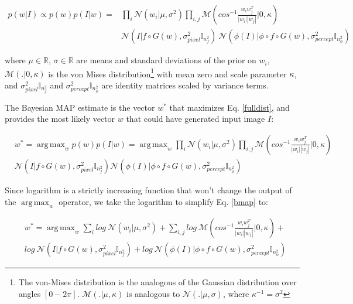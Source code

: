 \documentclass{article}
\DeclareMathOperator*{\argmax}{arg\,max}
\newcommand{\mc}[1]{\mathbb{#1}}
\newcommand{\ci}[1]{\circ{#1}}
\begin{document}
\begin{equation}
\begin{aligned}
\label{fulldist}
p(w|I) \propto p(w)p(I|w) = & \prod_i \mathcal{N}(w_i|\mu, \sigma^2) \prod_{i,j} \mathcal{M}(cos^{-1}\frac{w_iw_j^T}{|w_i| |w_j|}|0, \kappa) \\
             & \mathcal{N}(I|f \ci G(w), \sigma_{pixel}^2 \mc{I}_{n_f^2})\ \mathcal{N}(\phi(I)|\phi \ci f \ci G(w), \sigma_{percept}^2 \mc{I}_{n_{\phi}^2}) 
\end{aligned}
\end{equation}

where $\mu \in \mc{R}$, $\sigma \in \mc{R}$ are means and standard deviations of the prior on $w_i$, $\mathcal{M}(.|0, \kappa)$ is the von Mises distribution\footnote{The von-Mises distribution is the analogous of the Gaussian distribution over angles $[0-2\pi]$. $\mathcal{M}(.|\mu, \kappa)$ is analogous to $\mathcal{N}(.|\mu, \sigma)$, where $\kappa^{-1}=\sigma^2$} with mean zero and scale parameter $\kappa$, and $\sigma_{pixel}^2 \mc{I}_{n_f^2}$ and $\sigma_{percept}^2 \mc{I}_{n_{\phi}^2}$ are identity matrices scaled by variance terms. 

The Bayesian MAP estimate is the vector $w^*$ that maximizes Eq. \ref{fulldist}, and provides the most likely vector $w$ that could have generated input image $I$:


\begin{equation}
\begin{aligned}
\label{bmap}
& w^* = \argmax_w p(w)p(I|w) = \argmax_w \prod_i \mathcal{N}(w_i|\mu, \sigma^2) \prod_{i,j} \mathcal{M}(cos^{-1}\frac{w_iw_j^T}{|w_i| |w_j|}|0, \kappa) \\
& \mathcal{N}(I|f \ci G(w), \sigma_{pixel}^2 \mc{I}_{n_f^2}) \mathcal{N}(\phi(I)|\phi \ci f \ci G(w), \sigma_{percept}^2 \mc{I}_{n_{\phi}^2}) 
\end{aligned}
\end{equation}

Since logarithm is a strictly increasing function that won't change the output of the $\argmax_w$ operator, we take the logarithm to simplify Eq. \ref{bmap} to:

\begin{equation}
\begin{aligned}
\label{log}
& w^* = \argmax_w \sum_i log\  \mathcal{N}(w_i|\mu, \sigma^2) + \sum_{i,j} log\  \mathcal{M}(cos^{-1}\frac{w_iw_j^T}{|w_i| |w_j|}|0, \kappa) + \\
& log\ \mathcal{N}(I|f \ci G(w), \sigma_{pixel}^2 \mc{I}_{n_f^2}) + log\ \mathcal{N}(\phi(I)|\phi \ci f \ci G(w), \sigma_{percept}^2 \mc{I}_{n_{\phi}^2}) 
\end{aligned}
\end{equation}
\end{document}
